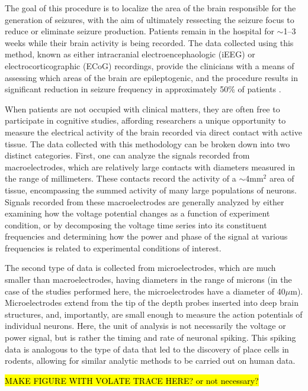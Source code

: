 The goal of this procedure is to localize the area of the brain responsible for the generation of seizures, with the aim of ultimately ressecting the seizure focus to reduce or eliminate seizure production. Patients remain in the hospital for $\sim$1--3 weeks while their brain activity is being recorded. The data collected using this method, known as either intracranial electroencephaologic (iEEG) or electrocorticographic (ECoG) recordings, provide the clinicians with a means of assessing which areas of the brain are epileptogenic, and the procedure results in significant reduction in seizure frequency in approximately 50\% of patients \citep{Kaha06}. 

When patients are not occupied with clinical matters, they are often free to participate in cognitive studies, affording researchers a unique opportunity to measure the electrical activity of the brain recorded via direct contact with active tissue. The data collected with this methodology can be broken down into two distinct categories. First, one can analyze the signals recorded from macroelectrodes, which are relatively large contacts with diameters measured in the range of millimeters. These contacts record the activity of a $\sim$4mm$^{2}$ area of tissue, encompassing the summed activity of many large populations of neurons. Signals recorded from these macroelectrodes are generally analyzed by either examining how the voltage potential changes as a function of experiment condition, or by decomposing the voltage time series into its constituent frequencies and determining how the power and phase of the signal at various frequencies is related to experimental conditions of interest.

The second type of data is collected from microelectrodes, which are much smaller than macroelectrodes, having diameters in the range of microns (in the case of the studies performed here, the microelectrodes have a diameter of 40$\mu$m). Microelectrodes extend from the tip of the depth probes inserted into deep brain structures, and, importantly, are small enough to measure the action potentials of individual neurons. Here, the unit of analysis is not necessarily the voltage or power signal, but is rather the timing and rate of neuronal spiking. This spiking data is analogous to the type of data that led to the discovery of place cells in rodents, allowing for similar analytic methods to be carried out on human data. 

\hl{MAKE FIGURE WITH VOLATE TRACE HERE? or not necessary?}

